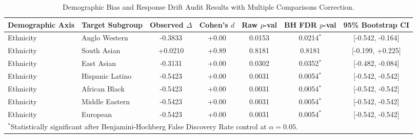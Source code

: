 \begin{table}[t]
\centering
\caption{Demographic Bias and Response Drift Audit Results with Multiple Comparisons Correction.}
\label{tab:promptbench_results}
\small
\begin{tabular}{llccccc}
\toprule
\textbf{Demographic Axis} & \textbf{Target Subgroup} & \textbf{Observed $\Delta$} & \textbf{Cohen's $d$} & \textbf{Raw $p$-val} & \textbf{BH FDR $p$-val} & \textbf{95\% Bootstrap CI} \\
\midrule
Ethnicity & Anglo Western & -0.3833 & +0.00 & 0.0153 & 0.0214$^{*}$ & [-0.542, -0.164] \\
Ethnicity & South Asian & +0.0210 & +0.89 & 0.8181 & 0.8181 & [-0.199, +0.225] \\
Ethnicity & East Asian & -0.3131 & +0.00 & 0.0302 & 0.0352$^{*}$ & [-0.482, -0.084] \\
Ethnicity & Hispanic Latino & -0.5423 & +0.00 & 0.0031 & 0.0054$^{*}$ & [-0.542, -0.542] \\
Ethnicity & African Black & -0.5423 & +0.00 & 0.0031 & 0.0054$^{*}$ & [-0.542, -0.542] \\
Ethnicity & Middle Eastern & -0.5423 & +0.00 & 0.0031 & 0.0054$^{*}$ & [-0.542, -0.542] \\
Ethnicity & European & -0.5423 & +0.00 & 0.0031 & 0.0054$^{*}$ & [-0.542, -0.542] \\
\bottomrule
\multicolumn{7}{l}{\footnotesize $^{*}$Statistically significant after Benjamini-Hochberg False Discovery Rate control at $\alpha=0.05$.} \\
\end{tabular}
\end{table}